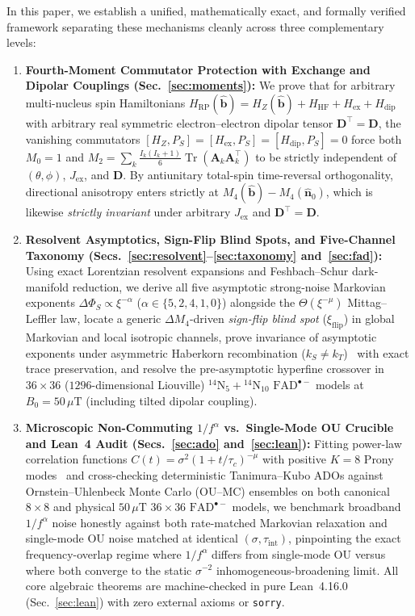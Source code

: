 \documentclass[twocolumn,10pt,amsmath,amssymb,floatfix]{revtex4-2}
\theoremstyle{plain}
\theoremstyle{definition}
\newcommand{\Tr}{\operatorname{Tr}}
\newcommand{\PS}{P_S}
\newcommand{\HRP}{H_{\mathrm{RP}}}
\newcommand{\HZ}{H_Z}
\newcommand{\HHF}{H_{\mathrm{HF}}}
\newcommand{\Hex}{H_{\mathrm{ex}}}
\newcommand{\Hdip}{H_{\mathrm{dip}}}
\newcommand{\DeltaPhi}{\Delta\Phi_S}
\newcommand{\xiflip}{\xi_{\mathrm{flip}}}
\begin{document}
In this paper, we establish a unified, mathematically exact, and formally verified framework separating these mechanisms cleanly across three complementary levels:

\begin{enumerate}[leftmargin=1.4em,itemsep=1pt,topsep=3pt]
\item \textbf{Fourth-Moment Commutator Protection with Exchange and Dipolar Couplings (Sec.~\ref{sec:moments}):} We prove that for arbitrary multi-nucleus spin Hamiltonians $\HRP(\hat{\mathbf{b}}) = \HZ(\hat{\mathbf{b}}) + \HHF + \Hex + \Hdip$ with arbitrary real symmetric electron--electron dipolar tensor $\mathbf{D}^\top = \mathbf{D}$, the vanishing commutators $[\HZ,\PS] = [\Hex,\PS] = [\Hdip,\PS] = 0$ force both $M_0 = 1$ and $M_2 = \sum_k \frac{I_k(I_k+1)}{6}\Tr(\mathbf{A}_k\mathbf{A}_k^\top)$ to be strictly independent of $(\theta,\phi)$, $J_{\mathrm{ex}}$, and $\mathbf{D}$. By antiunitary total-spin time-reversal orthogonality, directional anisotropy enters strictly at $M_4(\hat{\mathbf{b}}) - M_4(\hat{\mathbf{n}}_0)$, which is likewise \emph{strictly invariant} under arbitrary $J_{\mathrm{ex}}$ and $\mathbf{D}^\top = \mathbf{D}$.
\item \textbf{Resolvent Asymptotics, Sign-Flip Blind Spots, and Five-Channel Taxonomy (Secs.~\ref{sec:resolvent}--\ref{sec:taxonomy} and~\ref{sec:fad}):} Using exact Lorentzian resolvent expansions and Feshbach--Schur dark-manifold reduction, we derive all five asymptotic strong-noise Markovian exponents $\DeltaPhi \propto \xi^{-\alpha}$ ($\alpha \in \{5, 2, 4, 1, 0\}$) alongside the $\Theta(\xi^{-\mu})$ Mittag--Leffler law, locate a generic $\Delta M_4$-driven \emph{sign-flip blind spot} ($\xiflip$) in global Markovian and local isotropic channels, prove invariance of asymptotic exponents under asymmetric Haberkorn recombination ($k_S \neq k_T$)~\cite{Haberkorn1976MolPhys,Fay2018JCP} with exact trace preservation, and resolve the pre-asymptotic hyperfine crossover in $36\times 36$ ($1296$-dimensional Liouville) $^{14}\text{N}_5+{}^{14}\text{N}_{10}$ $\mathrm{FAD}^{\bullet-}$ models at $B_0 = 50\,\mu\text{T}$ (including tilted dipolar coupling).
\item \textbf{Microscopic Non-Commuting $1/f^\alpha$ vs.\ Single-Mode OU Crucible and Lean~4 Audit (Secs.~\ref{sec:ado} and~\ref{sec:lean}):} Fitting power-law correlation functions $C(t) = \sigma^2(1+t/\tau_c)^{-\mu}$ with positive $K=8$ Prony modes~\cite{Tanimura1989JPSJ,Ishizaki2005JPSJ,Tanimura2020JCP} and cross-checking deterministic Tanimura--Kubo ADOs against Ornstein--Uhlenbeck Monte Carlo (OU--MC) ensembles on both canonical $8\times 8$ and physical $50\,\mu\text{T}$ $36\times 36$ $\mathrm{FAD}^{\bullet-}$ models, we benchmark broadband $1/f^\alpha$ noise honestly against both rate-matched Markovian relaxation and single-mode OU noise matched at identical $(\sigma,\tau_{\mathrm{int}})$, pinpointing the exact frequency-overlap regime where $1/f^\alpha$ differs from single-mode OU versus where both converge to the static $\sigma^{-2}$ inhomogeneous-broadening limit. All core algebraic theorems are machine-checked in pure Lean~4.16.0 (Sec.~\ref{sec:lean}) with zero external axioms or \texttt{sorry}.
\end{enumerate}
\end{document}
